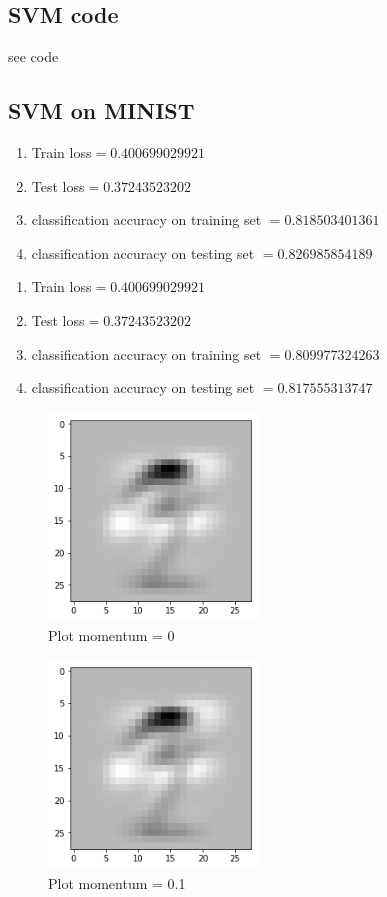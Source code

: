 \documentclass[letterpaper, 12]{article}
\begin{document}
\subsection{SVM code}
see code

\subsection{SVM on MINIST}
\begin{enumerate}
	\item Train loss$=0.400699029921$
	\item Test loss$=0.37243523202$
	\item classification accuracy on training set $= 0.818503401361$
	\item classification accuracy on testing set $=0.826985854189$
\end{enumerate}

\begin{enumerate}
	\item Train loss$=0.400699029921$
	\item Test loss$=0.37243523202$
	\item classification accuracy on training set $= 0.809977324263$
	\item classification accuracy on testing set $=0.817555313747$
\end{enumerate}

\begin{figure}[H]
\centering
\includegraphics[width=0.5\textwidth]{q2_3_1.png}
\caption{\label{}Plot momentum = 0 }
\end{figure}

\begin{figure}[H]
\centering
\includegraphics[width=0.5\textwidth]{q_2_3_2.png}
\caption{\label{}Plot momentum = 0.1 }
\end{figure}
\end{document}
